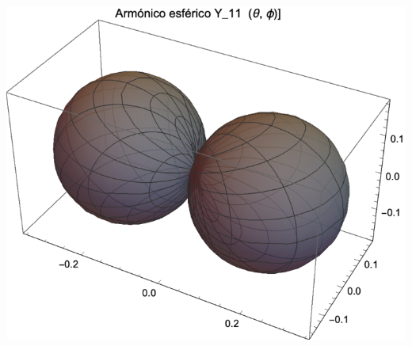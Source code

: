 \begin{minipage}{0.4\textwidth}
    \centering
    \includegraphics[scale=0.65]{Imagenes/Armonicos_Esfericos_11.eps}
\end{minipage}
\\[1em]
